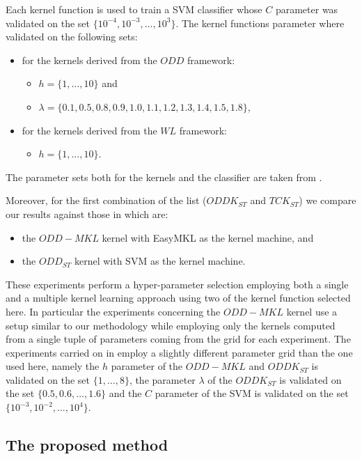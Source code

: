 Each kernel function is used to train a SVM classifier whose $C$ parameter
was validated on the set $\{10^{-4},10^{-3},\dots,10^3\}$.
The kernel functions parameter where validated on the following sets:
\begin{itemize}
    \item for the kernels derived from the $ODD$ framework:
    \begin{itemize}
        \item $h=\{1,\dots,10\}$ and 
        \item $\lambda=\{0.1, 0.5, 0.8, 0.9, 1.0, 1.1, 1.2, 1.3, 1.4, 1.5, 1.8\}$,
    \end{itemize}
    \item for the kernels derived from the $WL$ framework:
    \begin{itemize}
        \item $h=\{1,\dots,10\}$.
    \end{itemize}
\end{itemize}
The parameter sets both for the kernels and the classifier are taken from \cite{rtesselli}.

Moreover, for the first combination of the list ($ODDK_{ST}$ and $TCK_{ST}$)
we compare our results against those in \cite{gmkl} which are:

\begin{itemize}
    \item the $ODD-MKL$ kernel with EasyMKL as the kernel machine, and
    \item the $ODD_{ST}$ kernel with SVM as the kernel machine.
\end{itemize}

These experiments perform a hyper-parameter selection employing both a single and 
a multiple kernel learning approach using two of the kernel function selected here.
In particular the experiments concerning the $ODD-MKL$ kernel use a setup similar to
our methodology while employing only the kernels computed from a single tuple of
parameters coming from the grid for each experiment.
The experiments carried on in \cite{gmkl} employ a slightly different parameter grid
than the one used here, namely the $h$ parameter of the $ODD-MKL$ and $ODDK_{ST}$ is
validated on the set $\{1,\dots,8\}$, the parameter $\lambda$ of the $ODDK_{ST}$ is 
validated on the set $\{0.5,0.6,\dots,1.6\}$ and the $C$ parameter of the SVM
is validated on the set $\{10^{-3},10^{-2},\dots,10^4\}$.

\subsection{The proposed method}
\label{subsec:firstg}

